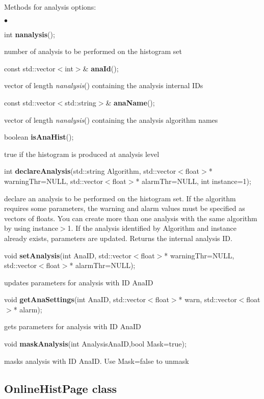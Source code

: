 \documentclass{lhcbnote}
\begin{document}
Methods for analysis options:
\begin{list}{$\bullet$}{}
\item   int {\bf  nanalysis}();

number of analysis to be performed on the histogram set
\item   const std::vector$<$int$>$\& {\bf anaId}();

vector of length {\it  nanalysis}() containing the analysis internal IDs
\item   const std::vector$<$std::string$>$\& {\bf anaName}();

vector of length {\it  nanalysis}() containing the analysis algorithm names
\item   boolean {\bf isAnaHist}();

true if the histogram is produced at analysis level
\item  int {\bf declareAnalysis}(std::string Algorithm, 
		      std::vector$<$float$>$* warningThr=NULL, 
		      std::vector$<$float$>$* alarmThr=NULL, 
		      int instance=1); 

declare an analysis to be performed on the histogram set. If the algorithm
requires some parameters, the warning and alarm values must be
specified as vectors of floats. You can create more than one analysis
with the same algorithm by using instance$>$1. If the analysis
identified by Algorithm and instance already exists, parameters are
updated. Returns the internal analysis ID.

\item   void {\bf setAnalysis}(int AnaID, 
		   std::vector$<$float$>$* warningThr=NULL, 
		   std::vector$<$float$>$* alarmThr=NULL);

updates parameters for analysis with ID AnaID
\item   void {\bf getAnaSettings}(int AnaID,
		      std::vector$<$float$>$* warn, 
		      std::vector$<$float$>$* alarm); 

gets parameters for analysis with ID AnaID
\item   void {\bf maskAnalysis}(int AnalysisAnaID,bool Mask=true); 

masks analysis with ID AnaID. Use Mask=false to unmask
\end{list}



\subsection{OnlineHistPage class}
\end{document}
